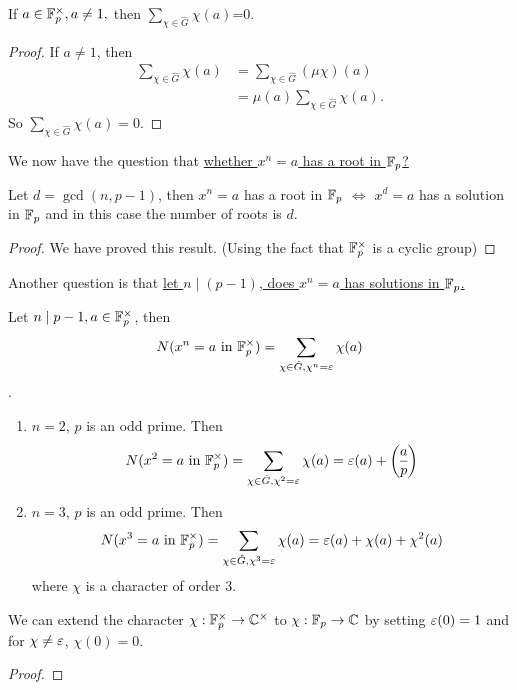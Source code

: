 \begin{corollary}
If $a\in\mathbb{F}_p^{\times}, a\ne1,$ then $\sum_{\chi\in\hat{G}}\chi(a)$=0.
\end{corollary}
\begin{proof}
If $a\ne1$, then \begin{align*}
\sum_{\chi\in\hat{G}}\chi(a) &=\sum_{\chi\in\hat{G}}(\mu\chi)(a)\\ 
&=\mu(a)\sum_{\chi\in\hat{G}}\chi(a).
\end{align*}
So $\sum_{\chi\in\hat{G}}\chi(a)=0$.
\end{proof}
We now have the question that \underline{whether $x^n=a$ has a root in $\mathbb{F}_p$?}\\
\begin{proposition}
Let $d = \gcd(n, p-1)$, then $x^n=a$ has a root in $\mathbb{F}_p$ $\Leftrightarrow$ $x^d=a$ has a solution in $\mathbb{F}_p$ and in this case the number of roots is $d$.
\end{proposition}
\begin{proof}
We have proved this result. (Using the fact that $\mathbb{F}_p^\times$ is a cyclic group)
\end{proof}
Another question is that \underline{let $n\mid(p-1)$, does $x^n = a$ has solutions in $\mathbb{F}_p$.}
\begin{theorem}
Let $n\mid p-1, a\in \mathbb{F}_p^\times$, then $$N(x^n=a\mbox{ in }\mathbb{F}_p^\times)=\sum_{\chi\in\hat{G},\chi^n=\varepsilon}\chi(a)$$.\end{theorem}
\begin{example}\mbox{}
\begin{enumerate}
	\item $n=2$, $p$ is an odd prime. Then
	$$N(x^2=a\mbox{ in }\F_p^\times)=\sum_{\chi\in\hat{G},\chi^2=\e}\chi(a)=\e(a)+\leg{a}{p}$$
	\item $n=3$, $p$ is an odd prime. Then
	$$N(x^3=a\mbox{ in }\mathbb{F}_p^\times)=\sum_{\chi\in\hat{G},\chi^3=\varepsilon}\chi(a)=\varepsilon(a)+\chi(a)+\chi^2(a)$$where $\chi$ is a character of order $3$.
\end{enumerate}
\end{example}
We can extend the character $\chi:\mathbb{F}_p^\times\rightarrow\mathbb{C}^\times$ to $\chi:\mathbb{F}_p\rightarrow\mathbb{C}$ by setting $\varepsilon(0)=1$ and for $\chi\ne\varepsilon$, $\chi(0)=0$.
\begin{proof}
\notcomplete
\end{proof}